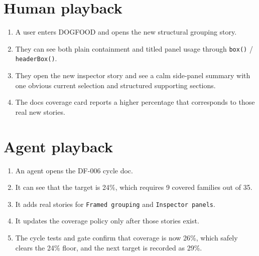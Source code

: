 \section{Human playback}\label{record-068-human-playback}

\begin{enumerate}
\def\labelenumi{\arabic{enumi}.}
\tightlist
\item
  A user enters DOGFOOD and opens the new structural grouping story.
\item
  They can see both plain containment and titled panel usage through \texttt{b\allowbreak{}o\allowbreak{}x\allowbreak{}(\allowbreak{})} / \texttt{h\allowbreak{}e\allowbreak{}a\allowbreak{}d\allowbreak{}e\allowbreak{}r\allowbreak{}B\allowbreak{}o\allowbreak{}x\allowbreak{}(\allowbreak{})}.
\item
  They open the new inspector story and see a calm side-panel summary with one obvious current selection and structured supporting sections.
\item
  The docs coverage card reports a higher percentage that corresponds to those real new stories.
\end{enumerate}

\section{Agent playback}\label{record-068-agent-playback}

\begin{enumerate}
\def\labelenumi{\arabic{enumi}.}
\tightlist
\item
  An agent opens the DF-006 cycle doc.
\item
  It can see that the target is 24\%, which requires 9 covered families out of 35.
\item
  It adds real stories for \texttt{F\allowbreak{}r\allowbreak{}a\allowbreak{}m\allowbreak{}e\allowbreak{}d\allowbreak{} \allowbreak{}g\allowbreak{}r\allowbreak{}o\allowbreak{}u\allowbreak{}p\allowbreak{}i\allowbreak{}n\allowbreak{}g} and \texttt{I\allowbreak{}n\allowbreak{}s\allowbreak{}p\allowbreak{}e\allowbreak{}c\allowbreak{}t\allowbreak{}o\allowbreak{}r\allowbreak{} \allowbreak{}p\allowbreak{}a\allowbreak{}n\allowbreak{}e\allowbreak{}l\allowbreak{}s}.
\item
  It updates the coverage policy only after those stories exist.
\item
  The cycle tests and gate confirm that coverage is now 26\%, which safely clears the 24\% floor, and the next target is recorded as 29\%.
\end{enumerate}

